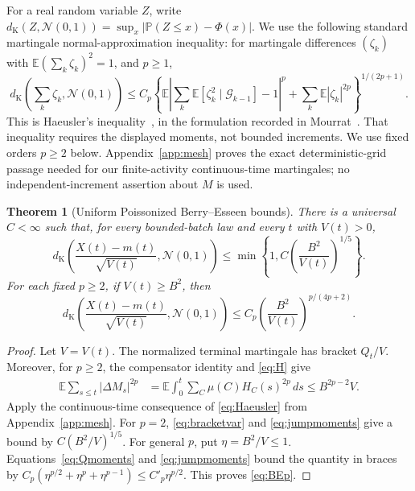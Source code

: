 \documentclass[11pt]{article}
\numberwithin{equation}{section}
\newtheorem{theorem}{Theorem}[section]
\theoremstyle{definition}
\theoremstyle{remark}
\newcommand{\E}{\mathbb E}
\newcommand{\Pp}{\mathbb P}
\newcommand{\dK}{d_{\mathrm K}}
\newcommand{\Normal}{\mathcal N(0,1)}
\begin{document}
For a real random variable $Z$, write
$\dK(Z,\Normal)=\sup_x|\Pp(Z\le x)-\Phi(x)|$.
We use the following standard martingale normal-approximation inequality:
for martingale differences $(\zeta_k)$ with
$\E(\sum_k\zeta_k)^2=1$, and $p\ge1$,
\begin{equation}\label{eq:Haeusler}
 \dK\left(\sum_k\zeta_k,\Normal\right)
 \le C_p\left\{
 \E\left|\sum_k\E[\zeta_k^2\mid\mathcal G_{k-1}]-1\right|^p
 +\sum_k\E|\zeta_k|^{2p}\right\}^{1/(2p+1)}.
\end{equation}
This is Haeusler's inequality~\cite{Haeusler}, in the formulation recorded in
Mourrat~\cite[Theorem~1.1]{Mourrat}. That inequality requires the displayed
moments, not bounded increments. We use fixed orders $p\ge2$ below.
Appendix~\ref{app:mesh} proves the exact
deterministic-grid passage needed for our finite-activity continuous-time
martingales; no independent-increment assertion about $M$ is used.

\begin{theorem}[Uniform Poissonized Berry--Esseen bounds]\label{thm:BE}
There is a universal $C<\infty$ such that, for every bounded-batch law and every
$t$ with $V(t)>0$,
\begin{equation}\label{eq:BE}
 \dK\left(\frac{X(t)-m(t)}{\sqrt{V(t)}},\Normal\right)
 \le \min\left\{1,C\left(\frac{B^2}{V(t)}\right)^{1/5}\right\}.
\end{equation}
For each fixed $p\ge2$, if $V(t)\ge B^2$, then
\begin{equation}\label{eq:BEp}
 \dK\left(\frac{X(t)-m(t)}{\sqrt{V(t)}},\Normal\right)
 \le C_p\left(\frac{B^2}{V(t)}\right)^{p/(4p+2)}.
\end{equation}
\end{theorem}
\begin{proof}
Let $V=V(t)$. The normalized terminal martingale has bracket $Q_t/V$. Moreover,
for $p\ge2$, the compensator identity and \eqref{eq:H} give
\begin{align}
 \E\sum_{s\le t}|\Delta M_s|^{2p}
 &=\E\int_0^t\sum_C\mu(C)H_C(s)^{2p}\,ds
 \le B^{2p-2}V.\label{eq:jumpmoments}
\end{align}
Apply the continuous-time consequence of \eqref{eq:Haeusler} from
Appendix~\ref{app:mesh}. For $p=2$, \eqref{eq:bracketvar} and
\eqref{eq:jumpmoments} give a bound by $C(B^2/V)^{1/5}$.
For general $p$, put $\eta=B^2/V\le1$. Equations~\eqref{eq:Qmoments} and
\eqref{eq:jumpmoments} bound the quantity in braces by
$C_p(\eta^{p/2}+\eta^p+\eta^{p-1})\le C'_p\eta^{p/2}$.
This proves \eqref{eq:BEp}.
\end{proof}
\end{document}

